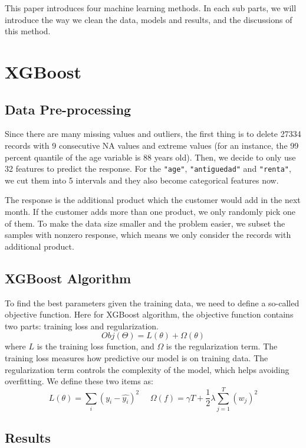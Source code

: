 \documentclass{article}
\begin{document}
\begin{spacing}{1}
\begin{large}
This paper introduces four machine learning methods. In each sub parts, we will introduce the way we clean the data, models and results, and the discussions of this method.

\section{XGBoost}


\subsection{Data Pre-processing}

\noindent \indent Since there are many missing values and outliers, the first thing is to delete 27334 records with 9 consecutive NA values and extreme values (for an instance, the 99 percent quantile of the age variable is 88 years old). Then, we decide to only use 32 features to predict the response. For the \verb|"age"|, \verb|"antiguedad"| and \verb|"renta"|, we cut them into 5 intervals and they also become categorical features now.

The response is the additional product which the customer would add in the next month. If the customer adds more than one product, we only randomly pick one of them. To make the data size smaller and the problem easier, we subset the samples with nonzero response, which means we only consider the records with additional product.

\subsection{XGBoost Algorithm}

\noindent \indent To find the best parameters given the training data, we need to define a so-called objective function. Here for XGBoost algorithm, the objective function contains two parts: training loss and regularization.
\[
Obj(\Theta) = L(\theta) + \Omega(\theta)
\]
where $L$ is the training loss function, and $\Omega$ is the regularization term. The training loss measures how predictive our model is on training data. The regularization term controls the complexity of the model, which helps avoiding overfitting. We define these two items as:
\[
L(\theta) = \sum_{i}(y_i - \hat{y_i})^2 \ \ \ \ \ \
\Omega(f) = \gamma T + \frac{1}{2}\lambda\sum_{j = 1}^{T}(w_j)^2
\]




\subsection{Results}


\end{large}
\end{spacing}
\end{document}
